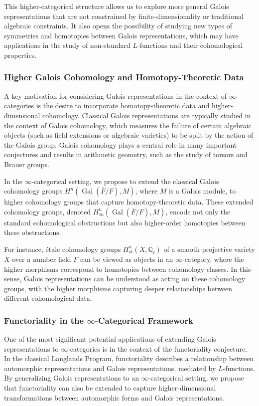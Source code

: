 \documentclass{article}
\theoremstyle{remark}
\begin{document}
This higher-categorical structure allows us to explore more general Galois representations that are not constrained by finite-dimensionality or traditional algebraic constraints. It also opens the possibility of studying new types of symmetries and homotopies between Galois representations, which may have applications in the study of non-standard $L$-functions and their cohomological properties.

\subsubsection{Higher Galois Cohomology and Homotopy-Theoretic Data}

A key motivation for considering Galois representations in the context of $\infty$-categories is the desire to incorporate homotopy-theoretic data and higher-dimensional cohomology. Classical Galois representations are typically studied in the context of Galois cohomology, which measures the failure of certain algebraic objects (such as field extensions or algebraic varieties) to be split by the action of the Galois group. Galois cohomology plays a central role in many important conjectures and results in arithmetic geometry, such as the study of torsors and Brauer groups.

In the $\infty$-categorical setting, we propose to extend the classical Galois cohomology groups $H^n(\operatorname{Gal}(\overline{F}/F), M)$, where $M$ is a Galois module, to higher cohomology groups that capture homotopy-theoretic data. These extended cohomology groups, denoted $H^n_{\infty}(\operatorname{Gal}(\overline{F}/F), M)$, encode not only the standard cohomological obstructions but also higher-order homotopies between these obstructions.

For instance, étale cohomology groups $H^n_{\text{et}}(X, \mathbb{Q}_\ell)$ of a smooth projective variety $X$ over a number field $F$ can be viewed as objects in an $\infty$-category, where the higher morphisms correspond to homotopies between cohomology classes. In this sense, Galois representations can be understood as acting on these cohomology groups, with the higher morphisms capturing deeper relationships between different cohomological data.

\subsubsection{Functoriality in the $\infty$-Categorical Framework}

One of the most significant potential applications of extending Galois representations to $\infty$-categories is in the context of the functoriality conjecture. In the classical Langlands Program, functoriality describes a relationship between automorphic representations and Galois representations, mediated by $L$-functions. By generalizing Galois representations to an $\infty$-categorical setting, we propose that functoriality can also be extended to capture higher-dimensional transformations between automorphic forms and Galois representations.
\end{document}
